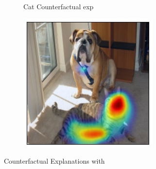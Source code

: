\begin{figure}[ht!]
\begin{subfigure}[t]{0.158\textwidth}
        \caption{\scriptsize{Cat Counterfactual exp}}
		\label{fig:neg_exp_cat}
	\end{subfigure}
    \centering
	\begin{subfigure}[t]{0.158\textwidth}
        \centering
        \includegraphics[width=\textwidth]{figures/dog_neg_exp.jpg}
        \caption{}%
		\label{fig:neg_exp_dog}
	\end{subfigure}
    \vspace{10pt}
    \caption{Counterfactual Explanations with \gcam{}}
    \label{fig:negexp}
\end{figure}
